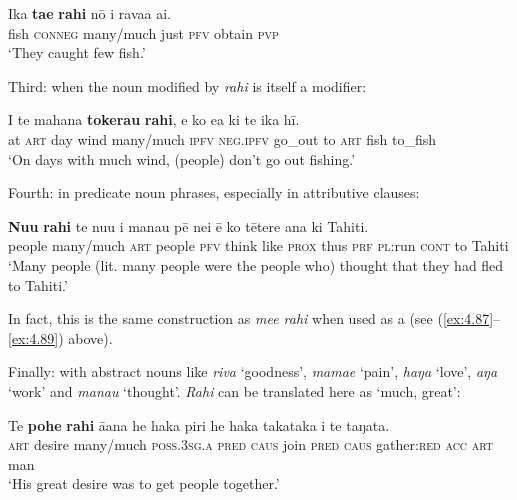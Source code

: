 \ea\label{ex:4.103}
\gll Ika \textbf{ta{\ꞌ}e} \textbf{rahi} nō i rava{\ꞌ}a ai. \\
fish \textsc{conneg} many/much just \textsc{pfv} obtain \textsc{pvp} \\

\glt
‘They caught few fish.’ \textstyleExampleref{[R312.010]} 
\z

Third: when the noun modified by \textit{rahi} is itself a modifier:

\ea\label{ex:4.104}
\gll {\ꞌ}I te mahana \textbf{tokerau} \textbf{rahi}, e ko e{\ꞌ}a ki te ika hī. \\
at \textsc{art} day wind many/much \textsc{ipfv} \textsc{neg.ipfv} go\_out to \textsc{art} fish to\_fish \\

\glt
‘On days with much wind, (people) don’t go out fishing.’ \textstyleExampleref{[R334.254]} 
\z

Fourth: in predicate noun phrases, especially in attributive clauses:

\ea\label{ex:4.105}
\gll \textbf{Nu{\ꞌ}u} \textbf{rahi} te nu{\ꞌ}u i mana{\ꞌ}u pē nei ē ko tētere {\ꞌ}ana ki Tahiti. \\
people many/much \textsc{art} people \textsc{pfv} think like \textsc{prox} thus \textsc{prf} \textsc{pl}:run \textsc{cont} to Tahiti \\

\glt
‘Many people (lit. many people were the people who) thought that they had fled to Tahiti.’ \textstyleExampleref{[R303.051]} 
\z

In fact, this is the same construction as \textit{me{\ꞌ}e rahi} when used as a  (see (\ref{ex:4.87}–\ref{ex:4.89}) above).

Finally: with abstract nouns like \textit{riva} ‘goodness’, \textit{mamae} ‘pain’, \textit{haŋa} ‘love’, \textit{aŋa} ‘work’ and \textit{mana{\ꞌ}u} ‘thought’. \textit{Rahi} can be translated here as ‘much, great’:

\ea\label{ex:4.106}
\gll Te \textbf{pohe} \textbf{rahi} {\ꞌ}ā{\ꞌ}ana he haka piri he haka takataka  i te taŋata.\\
\textsc{art} desire many/much \textsc{poss.3sg.a} \textsc{pred} \textsc{caus} join \textsc{pred} \textsc{caus} gather:\textsc{red}  \textsc{acc} \textsc{art} man\\

\glt 
‘His great desire was to get people together.’ \textstyleExampleref{[R302.039]} 
\z

